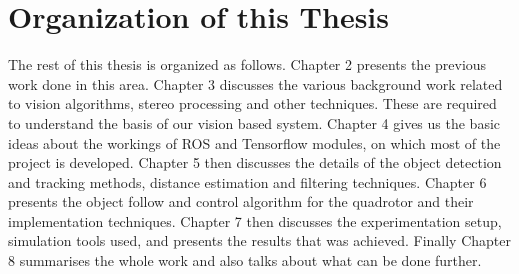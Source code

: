	\section{Organization of this Thesis}
	\label{sec:Organization of this Thesis}
		The rest of this thesis is organized as follows. Chapter 2 presents the previous work done in this area. Chapter 3 discusses the various background work related to vision algorithms, stereo processing and other techniques. These are required to understand the basis of our vision based system. Chapter 4 gives us the basic ideas about the workings of ROS and Tensorflow modules, on which most of the project is developed. Chapter 5 then discusses the details of the object detection and tracking methods, distance estimation and filtering techniques. Chapter 6 presents the object follow and control algorithm for the quadrotor and their implementation techniques. Chapter 7 then discusses the experimentation setup, simulation tools used, and presents the results that was achieved. Finally Chapter 8 summarises the whole work and also talks about what can be done further.
		




